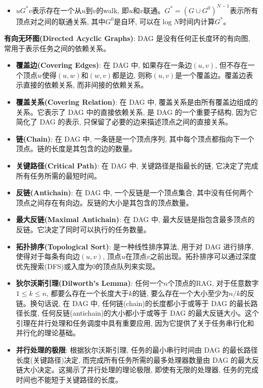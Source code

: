 \documentclass[12pt, a4paper, UTF8]{ctexart}
\newcommand{\term}[1]{\textbf{\textcolor{blue!80!black}{#1}}}
\newcommand{\emphb}[1]{\textbf{#1}}
\begin{document}
\begin{sloppypar}
\begin{itemize}[nosep]
        \item $u G^* v$表示存在一个从$u$到$v$的walk, 即$u$和$v$联通。$G^* = (G \cup G^0)^{N-1}$表示所有顶点对之间的联通关系, 其中$G^0$是自环, 可以在$\log N$时间内计算$G^*$。
    \end{itemize}
    \term{有向无环图(Directed Acyclic Graphs)}: DAG 是没有任何正长度环的有向图, 常用于表示任务之间的依赖关系。
    \begin{itemize}[nosep]
        \item \term{覆盖边(Covering Edges)}: 在 DAG 中, 如果存在一条边$(u, v)$, 但不存在一个顶点$w$使得$(u, w)$和$(w, v)$都是边, 则称$(u, v)$是一个覆盖边。覆盖边表示直接的依赖关系, 而非间接的依赖关系。
        \item \term{覆盖关系(Covering Relation)}: 在 DAG 中, 覆盖关系是由所有覆盖边组成的关系。它表示了 DAG 中的直接依赖关系, 是 DAG 的一个重要子结构, 因为它简化了 DAG 的表示, 只保留了必要的边来描述顶点之间的直接关系。
        \item \term{链(Chain)}: 在 DAG 中, 一条链是一个顶点序列, 其中每个顶点都指向下一个顶点。链的长度是其包含的边的数量。
        \item \term{关键路径(Critical Path)}: 在 DAG 中, 关键路径是指最长的链, 它决定了完成所有任务所需的最短时间。
        \item \term{反链(Antichain)}: 在 DAG 中, 一个反链是一个顶点集合, 其中没有任何两个顶点之间存在有向边。反链的大小是其包含的顶点数量。
        \item \term{最大反链(Maximal Antichain)}: 在 DAG 中, 最大反链是指包含最多顶点的反链。它决定了同时可以执行的任务数量。
        \item \term{拓扑排序(Topological Sort)}: 是一种线性排序算法, 用于对 DAG 进行排序, 使得对于每条有向边$(u, v)$, 顶点$u$在顶点$v$之前出现。拓扑排序可以通过深度优先搜索(DFS)或入度为0的顶点队列来实现。
        \item \term{狄尔沃斯引理(Dilworth's Lemma)}: 任何一个$n$个顶点的RAG, 对于任意数字$1 \le k \le n$, 都要么存在一个长度大于$k$的链, 要么存在一个大小至少为$n/k$的反链。换句话说, 在 DAG 中, 任何链(chain)的长度都小于或等于 DAG 的最长路径长度, 任何反链(antichain)的大小都小于或等于 DAG 的最大反链大小。这个引理在并行处理和任务调度中具有重要应用, 因为它提供了关于任务串行化和并行化的理论基础。
        \item \emphb{并行处理的极限}: 根据狄尔沃斯引理, 任务的最小串行时间由 DAG 的最长路径长度(关键路径)决定, 而完成所有任务所需的最多处理器数量由 DAG 的最大反链大小决定。这揭示了并行处理的理论极限, 即使有无限的处理器, 任务的完成时间也不能短于关键路径的长度。
    \end{itemize}

\end{sloppypar}
\end{document}
